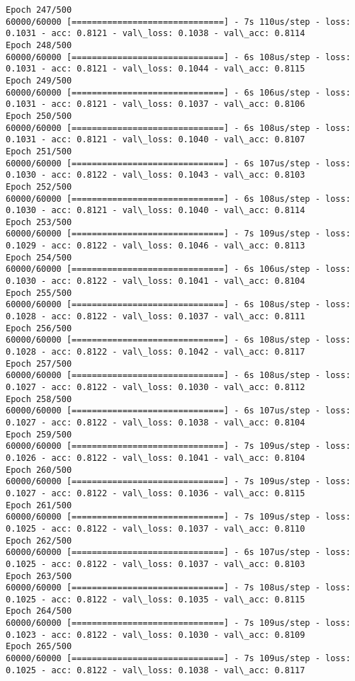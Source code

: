 \documentclass[11pt]{article}
\begin{document}
\begin{Verbatim}[commandchars=\\\{\}]
Epoch 247/500
60000/60000 [==============================] - 7s 110us/step - loss: 0.1031 - acc: 0.8121 - val\_loss: 0.1038 - val\_acc: 0.8114
Epoch 248/500
60000/60000 [==============================] - 6s 108us/step - loss: 0.1031 - acc: 0.8121 - val\_loss: 0.1044 - val\_acc: 0.8115
Epoch 249/500
60000/60000 [==============================] - 6s 106us/step - loss: 0.1031 - acc: 0.8121 - val\_loss: 0.1037 - val\_acc: 0.8106
Epoch 250/500
60000/60000 [==============================] - 6s 108us/step - loss: 0.1031 - acc: 0.8121 - val\_loss: 0.1040 - val\_acc: 0.8107
Epoch 251/500
60000/60000 [==============================] - 6s 107us/step - loss: 0.1030 - acc: 0.8122 - val\_loss: 0.1043 - val\_acc: 0.8103
Epoch 252/500
60000/60000 [==============================] - 6s 108us/step - loss: 0.1030 - acc: 0.8121 - val\_loss: 0.1040 - val\_acc: 0.8114
Epoch 253/500
60000/60000 [==============================] - 7s 109us/step - loss: 0.1029 - acc: 0.8122 - val\_loss: 0.1046 - val\_acc: 0.8113
Epoch 254/500
60000/60000 [==============================] - 6s 106us/step - loss: 0.1030 - acc: 0.8122 - val\_loss: 0.1041 - val\_acc: 0.8104
Epoch 255/500
60000/60000 [==============================] - 6s 108us/step - loss: 0.1028 - acc: 0.8122 - val\_loss: 0.1037 - val\_acc: 0.8111
Epoch 256/500
60000/60000 [==============================] - 6s 108us/step - loss: 0.1028 - acc: 0.8122 - val\_loss: 0.1042 - val\_acc: 0.8117
Epoch 257/500
60000/60000 [==============================] - 6s 108us/step - loss: 0.1027 - acc: 0.8122 - val\_loss: 0.1030 - val\_acc: 0.8112
Epoch 258/500
60000/60000 [==============================] - 6s 107us/step - loss: 0.1027 - acc: 0.8122 - val\_loss: 0.1038 - val\_acc: 0.8104
Epoch 259/500
60000/60000 [==============================] - 7s 109us/step - loss: 0.1026 - acc: 0.8122 - val\_loss: 0.1041 - val\_acc: 0.8104
Epoch 260/500
60000/60000 [==============================] - 7s 109us/step - loss: 0.1027 - acc: 0.8122 - val\_loss: 0.1036 - val\_acc: 0.8115
Epoch 261/500
60000/60000 [==============================] - 7s 109us/step - loss: 0.1025 - acc: 0.8122 - val\_loss: 0.1037 - val\_acc: 0.8110
Epoch 262/500
60000/60000 [==============================] - 6s 107us/step - loss: 0.1025 - acc: 0.8122 - val\_loss: 0.1037 - val\_acc: 0.8103
Epoch 263/500
60000/60000 [==============================] - 7s 108us/step - loss: 0.1025 - acc: 0.8122 - val\_loss: 0.1035 - val\_acc: 0.8115
Epoch 264/500
60000/60000 [==============================] - 7s 109us/step - loss: 0.1023 - acc: 0.8122 - val\_loss: 0.1030 - val\_acc: 0.8109
Epoch 265/500
60000/60000 [==============================] - 7s 109us/step - loss: 0.1025 - acc: 0.8122 - val\_loss: 0.1038 - val\_acc: 0.8117

\end{Verbatim}
\end{document}
